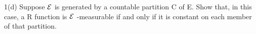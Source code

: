 1(d)
Suppose $\mathcal{E}$ is generated by a countable partition C of E.
Show that, in this case, a R function is $\mathcal{E}$ -measurable if and only if it is constant on each member of that partition.